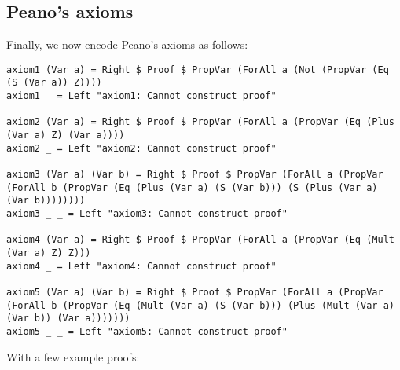 \documentclass{article}
\begin{document}
\subsection{Peano's axioms}

Finally, we now encode Peano's axioms as follows:

\begin{lstlisting}
axiom1 (Var a) = Right $ Proof $ PropVar (ForAll a (Not (PropVar (Eq (S (Var a)) Z))))
axiom1 _ = Left "axiom1: Cannot construct proof"

axiom2 (Var a) = Right $ Proof $ PropVar (ForAll a (PropVar (Eq (Plus (Var a) Z) (Var a))))
axiom2 _ = Left "axiom2: Cannot construct proof"

axiom3 (Var a) (Var b) = Right $ Proof $ PropVar (ForAll a (PropVar (ForAll b (PropVar (Eq (Plus (Var a) (S (Var b))) (S (Plus (Var a) (Var b))))))))
axiom3 _ _ = Left "axiom3: Cannot construct proof"

axiom4 (Var a) = Right $ Proof $ PropVar (ForAll a (PropVar (Eq (Mult (Var a) Z) Z)))
axiom4 _ = Left "axiom4: Cannot construct proof"

axiom5 (Var a) (Var b) = Right $ Proof $ PropVar (ForAll a (PropVar (ForAll b (PropVar (Eq (Mult (Var a) (S (Var b))) (Plus (Mult (Var a) (Var b)) (Var a)))))))
axiom5 _ _ = Left "axiom5: Cannot construct proof"
\end{lstlisting}

With a few example proofs:
\end{document}

